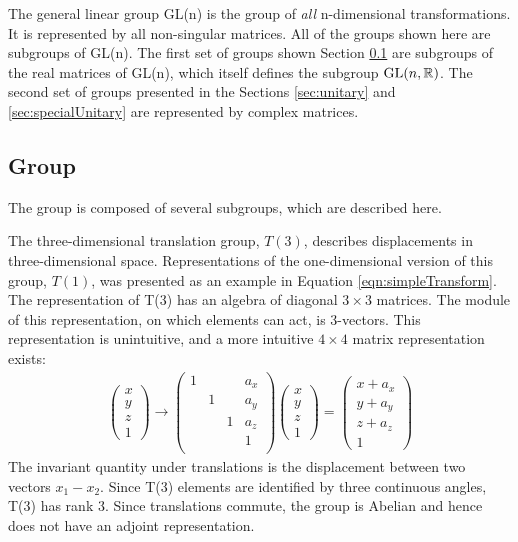 The general linear group GL(n) is the group of \emph{all} n-dimensional transformations.
It is represented by all non-singular \nxn matrices.
All of the groups shown here are subgroups of GL(n).
The first set of groups shown Section \ref{sec:poincare} are subgroups of the real \nxn matrices of GL(n), which itself defines the subgroup $\text{GL}(n,\mathbb{R})$.
The second set of groups presented in the Sections \ref{sec:unitary} and \ref{sec:specialUnitary} are represented by complex matrices.

\subsection{\poincare Group}\label{sec:poincare}


The \poincare group is composed of several subgroups, which are described here.

The three-dimensional translation group, $T(3)$, describes displacements in three-dimensional space.
Representations of the one-dimensional version of this group, $T(1)$, was presented as an example in Equation \ref{eqn:simpleTransform}.
The representation of T(3) has an algebra of diagonal $3\times3$ matrices. \check
The module of this representation, on which elements can act, is 3-vectors.
This representation is unintuitive, and a more intuitive $4\times4$ matrix representation exists:
\begin{equation}\begin{split}
\begin{pmatrix}
x\\y\\z\\1
\end{pmatrix}\to
\begin{pmatrix}
1& & & a_x \\
 &1& & a_y \\
 & &1& a_z \\
 & & & 1   \\
\end{pmatrix}
\begin{pmatrix}
x\\y\\z\\1
\end{pmatrix}=
\begin{pmatrix}
x+a_x\\y+a_y\\z+a_z\\1
\end{pmatrix}
\end{split}\end{equation} 
The invariant quantity under translations is the displacement between two vectors $x_1-x_2$.
Since T(3) elements are identified by three continuous angles, T(3) has rank 3.
Since translations commute, the group is Abelian and hence does not have an adjoint representation.

